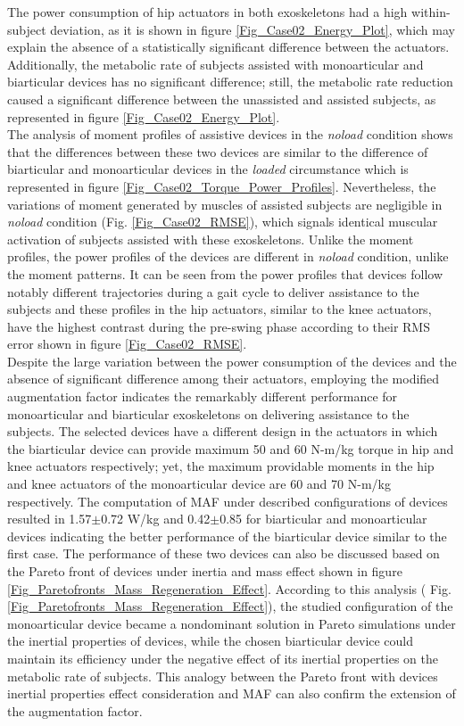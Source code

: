 \documentclass[10pt,letterpaper]{article}
\begin{document}
The power consumption of hip actuators in both exoskeletons had a high within-subject deviation, as it is shown in figure \ref{Fig_Case02_Energy_Plot}, which may explain the absence of a statistically significant difference between the actuators.  Additionally, the metabolic rate of subjects assisted with monoarticular and biarticular devices has no significant difference; still, the metabolic rate reduction caused a significant difference between the unassisted and assisted subjects, as represented in figure \ref{Fig_Case02_Energy_Plot}. \\
The analysis of moment profiles of assistive devices in the {\it noload} condition shows that the differences between these two devices are similar to the difference of biarticular and monoarticular devices in the {\it loaded} circumstance which is represented in figure \ref{Fig_Case02_Torque_Power_Profiles}. Nevertheless, the variations of moment generated by muscles of assisted subjects are negligible in {\it noload} condition (Fig. \ref{Fig_Case02_RMSE}), which signals identical muscular activation of subjects assisted with these exoskeletons. Unlike the moment profiles, the power profiles of the devices are different in {\it noload} condition, unlike the moment patterns. It can be seen from the power profiles that devices follow notably different trajectories during a gait cycle to deliver assistance to the subjects and these profiles in the hip actuators, similar to the knee actuators, have the highest contrast during the pre-swing phase according to their RMS error shown in figure \ref{Fig_Case02_RMSE}.\\
Despite the large variation between the power consumption of the devices and the absence of significant difference among their actuators, employing the modified augmentation factor indicates the remarkably different performance for monoarticular and biarticular exoskeletons on delivering assistance to the subjects. The selected devices have a different design in the actuators in which the biarticular device can provide maximum 50 and 60 N-m/kg torque in hip and knee actuators respectively; yet, the maximum providable moments in the hip and knee actuators of the monoarticular device are 60 and 70 N-m/kg respectively. The computation of MAF under described configurations of devices resulted in 1.57$\pm$0.72 W/kg and 0.42$\pm$0.85 for biarticular and monoarticular devices indicating the better performance of the biarticular device similar to the first case. The performance of these two devices can also be discussed based on the Pareto front of devices under inertia and mass effect shown in figure \ref{Fig_Paretofronts_Mass_Regeneration_Effect}. According to this analysis ( Fig. \ref{Fig_Paretofronts_Mass_Regeneration_Effect}), the studied configuration of the monoarticular device became a nondominant solution in Pareto simulations under the inertial properties of devices, while the chosen biarticular device could maintain its efficiency under the negative effect of its inertial properties on the metabolic rate of subjects. This analogy between the Pareto front with devices inertial properties effect consideration and MAF can also confirm the extension of the augmentation factor.\\
\end{document}
